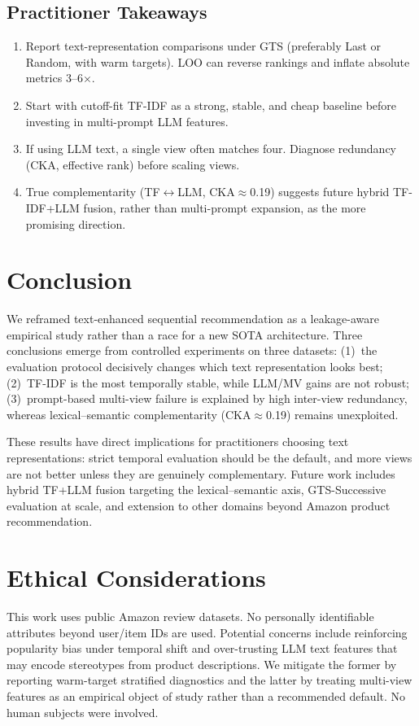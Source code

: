 \documentclass[sigconf,natbib=true,anonymous]{acmart}
\newcommand{\tfidf}{\textsc{TF-IDF}\xspace}
\newcommand{\llm}{\textsc{LLM}\xspace}
\begin{document}
\subsection{Practitioner Takeaways}
\begin{enumerate}[leftmargin=*,itemsep=2pt]
\item Report text-representation comparisons under GTS (preferably Last or Random, with warm targets).  LOO can reverse rankings and inflate absolute metrics 3--6$\times$.
\item Start with cutoff-fit \tfidf as a strong, stable, and cheap baseline before investing in multi-prompt \llm features.
\item If using \llm text, a single view often matches four.  Diagnose redundancy (CKA, effective rank) before scaling views.
\item True complementarity (TF$\leftrightarrow$LLM, CKA$\approx$0.19) suggests future hybrid \tfidf+\llm fusion, rather than multi-prompt expansion, as the more promising direction.
\end{enumerate}

\section{Conclusion}
\label{sec:conclusion}

We reframed text-enhanced sequential recommendation as a leakage-aware empirical study rather than a race for a new SOTA architecture.
Three conclusions emerge from controlled experiments on three datasets:
(1)~the evaluation protocol decisively changes which text representation looks best;
(2)~\tfidf is the most temporally stable, while \llm/MV gains are not robust;
(3)~prompt-based multi-view failure is explained by high inter-view redundancy, whereas lexical--semantic complementarity (CKA$\approx$0.19) remains unexploited.

These results have direct implications for practitioners choosing text representations: strict temporal evaluation should be the default, and more views are not better unless they are genuinely complementary.
Future work includes hybrid TF+LLM fusion targeting the lexical--semantic axis, GTS-Successive evaluation at scale, and extension to other domains beyond Amazon product recommendation.

\section*{Ethical Considerations}
This work uses public Amazon review datasets.
No personally identifiable attributes beyond user/item IDs are used.
Potential concerns include reinforcing popularity bias under temporal shift and over-trusting LLM text features that may encode stereotypes from product descriptions.
We mitigate the former by reporting warm-target stratified diagnostics and the latter by treating multi-view features as an empirical object of study rather than a recommended default.
No human subjects were involved.
\end{document}
